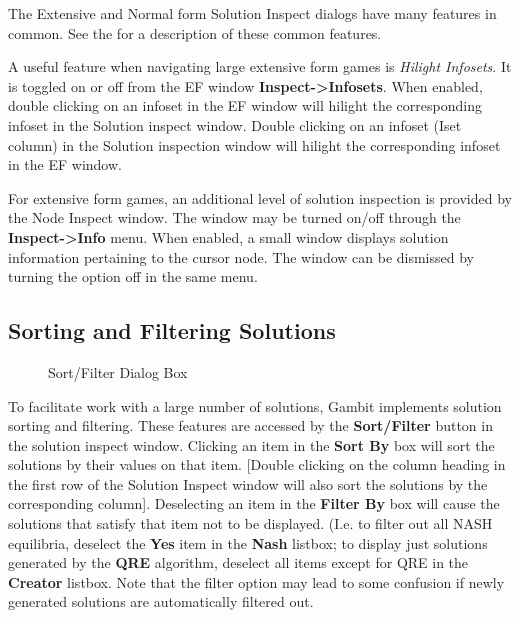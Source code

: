 \documentclass[12pt]{report}
\begin{document}
The Extensive and Normal form Solution Inspect dialogs have many
features in common.  See the  for a description of these common features.

A useful feature when navigating large extensive form games is {\em 
Hilight Infosets}.  It is toggled on or off from the EF window {\bf 
Inspect->Infosets}.  When enabled, double clicking on an infoset in
the EF window will hilight the corresponding infoset in the Solution
inspect window.  Double clicking on an infoset (Iset column) in the
Solution inspection window will hilight the corresponding infoset in
the EF window.

For extensive form games, an additional level of solution inspection
is provided by the Node Inspect window.  The window may be turned
on/off through the {\bf Inspect->Info} menu. When enabled, a small
window displays solution information pertaining to the cursor node.
The window can be dismissed by turning the option off in the same
menu.


\subsection{Sorting and Filtering Solutions}\label{SolnSortFilt}
\begin{figure}
\caption{Sort/Filter Dialog Box}\label{fig_nfgsortfilt}
\end{figure}

To facilitate work with a large number of solutions, Gambit implements
solution sorting and filtering.  These features are accessed by the
{\bf Sort/Filter} button in the solution inspect window.  Clicking an
item in the {\bf Sort By} box will sort the solutions by their values
on that item.  [Double clicking on the column heading in the first row
of the Solution Inspect window will also sort the solutions by the
corresponding column].  Deselecting an item in the {\bf Filter By} box
will cause the solutions that satisfy that item not to be displayed.
(I.e. to filter out all NASH equilibria, deselect the {\bf Yes} item
in the {\bf Nash} listbox; to display just solutions generated by the
{\bf QRE} algorithm, deselect all items except for QRE in the {\bf 
Creator} listbox.  Note that the filter option may lead to some
confusion if newly generated solutions are automatically filtered out.
\end{document}
